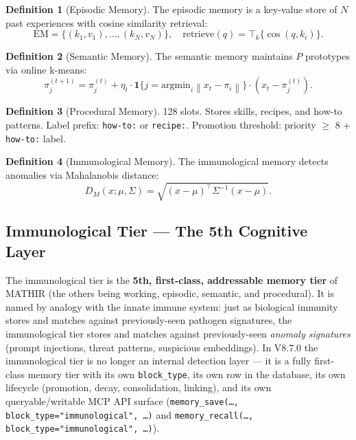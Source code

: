 \documentclass[12pt,a4paper]{article}
\theoremstyle{definition}
\newtheorem{definition}{Definition}[section]
\theoremstyle{remark}
\newcommand{\norm}[1]{\left\|#1\right\|}
\newcommand{\argmin}{\mathrm{argmin}}
\begin{document}
\begin{definition}[Episodic Memory]
The episodic memory is a key-value store of $N$ past experiences with cosine similarity retrieval:
\begin{equation}
    \text{EM} = \{(k_1, v_1), \ldots, (k_N, v_N)\}, \quad \text{retrieve}(q) = \top_k\{\cos(q, k_i)\}.
\end{equation}
\end{definition}

\begin{definition}[Semantic Memory]
The semantic memory maintains $P$ prototypes via online k-means:
\begin{equation}
    \pi_j^{(t+1)} = \pi_j^{(t)} + \eta_t \cdot \mathbf{1}\{j = \argmin_i \norm{x_t - \pi_i}\} \cdot (x_t - \pi_j^{(t)}).
\end{equation}
\end{definition}

\begin{definition}[Procedural Memory]
128 slots. Stores skills, recipes, and how-to patterns. Label prefix: \texttt{how-to:} or \texttt{recipe:}. Promotion threshold: priority $\geq$ 8 + \texttt{how-to:} label.
\end{definition}

\begin{definition}[Immunological Memory]
The immunological memory detects anomalies via Mahalanobis distance:
\begin{equation}
    D_M(x; \mu, \Sigma) = \sqrt{(x - \mu)^\top \Sigma^{-1} (x - \mu)}.
\end{equation}
\end{definition}

\subsection{Immunological Tier --- The 5th Cognitive Layer}

The immunological tier is the \textbf{5th, first-class, addressable memory tier} of MATHIR (the others being working, episodic, semantic, and procedural). It is named by analogy with the innate immune system: just as biological immunity stores and matches against previously-seen pathogen signatures, the immunological tier stores and matches against previously-seen \emph{anomaly signatures} (prompt injections, threat patterns, suspicious embeddings). In V8.7.0 the immunological tier is no longer an internal detection layer --- it is a fully first-class memory tier with its own \texttt{block\_type}, its own row in the database, its own lifecycle (promotion, decay, consolidation, linking), and its own queryable/writable MCP API surface (\texttt{memory\_save(\ldots, block\_type="immunological", \ldots)} and \texttt{memory\_recall(\ldots, block\_type="immunological", \ldots)}).
\end{document}
